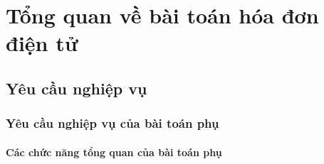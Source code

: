 \documentclass{report} %
\begin{document}

% 
% 
% 
% 
% 
% 
% 
% 
% 
% 
% 

% 
% 
% 

\chapter{Tổng quan về bài toán hóa đơn điện tử}
% 

% 

\section{Yêu cầu nghiệp vụ}
% 

\subsection{Yêu cầu nghiệp vụ của bài toán phụ}
% 
\subsubsection{Các chức năng tổng quan của bài toán phụ}


\end{document}
